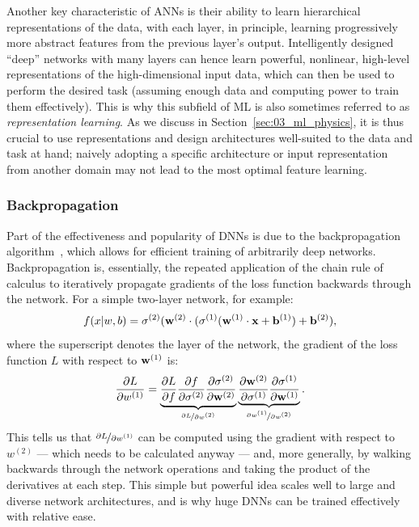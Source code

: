 Another key characteristic of ANNs is their ability to learn hierarchical representations of the data, with each layer, in principle, learning progressively more abstract features from the previous layer's output.
Intelligently designed ``deep'' networks with many layers can hence learn powerful, nonlinear, high-level representations of the high-dimensional input data, which can then be used to perform the desired task (assuming enough data and computing power to train them effectively).
This is why this subfield of ML is also sometimes referred to as \textit{representation learning}.
As we discuss in Section~\ref{sec:03_ml_physics}, it is thus crucial to use representations and design architectures well-suited to the data and task at hand; naively adopting a specific architecture or input representation from another domain may not lead to the most optimal feature learning.


\subsubsection{Backpropagation}

Part of the effectiveness and popularity of DNNs is due to the backpropagation algorithm~\cite{rumelhart1986learning}, which allows for efficient training of arbitrarily deep networks.
Backpropagation is, essentially, the repeated application of the chain rule of calculus to iteratively propagate gradients of the loss function backwards through the network.
For a simple two-layer network, for example:
\begin{equation}
    \label{eq:03_ml_backprop_nn}
    f(x|w, b) = \sigma^{(2)}(\mathbf{w}^{(2)} \cdot (\sigma^{(1)}(\mathbf{w}^{(1)} \cdot \mathbf{x} + \mathbf{b}^{(1)}) + \mathbf{b}^{(2)}),
\end{equation}
where the superscript denotes the layer of the network, the gradient of the loss function $L$ with respect to $\mathbf{w}^{(1)}$ is:
\begin{equation}
    \label{eq:03_ml_backprop}
    \frac{\partial L}{\partial w^{(1)}} = \underbrace{\frac{\partial L}{\partial f} \frac{\partial f}{\partial \sigma^{(2)}} \frac{\partial \sigma^{(2)}}{\partial \cvec{w}^{(2)}}}_{\cnicefrac{\partial L}{\partial w^{(2)}}}
    \underbrace{\frac{\partial \cvec{w}^{(2)}}{\partial \sigma^{(1)}} \frac{\partial \sigma^{(1)}}{\partial \cvec{w}^{(1)}}}_{\cnicefrac{\partial w^{(1)}}{\partial w^{(2)}}}.
\end{equation}
This tells us that $\cnicefrac{\partial L}{\partial w^{(1)}}$ can be computed using the gradient with respect to $w^{(2)}$ --- which needs to be calculated anyway --- and, more generally, by walking backwards through the network operations and taking the product of the derivatives at each step.
This simple but powerful idea scales well to large and diverse network architectures, and is why huge DNNs can be trained effectively with relative ease.

